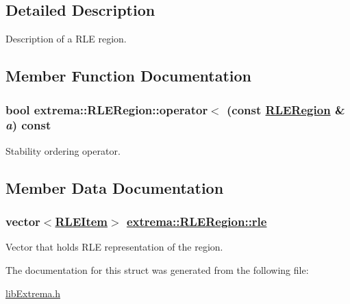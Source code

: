 \subsection{Detailed Description}
Description of a RLE region. 



\subsection{Member Function Documentation}
\hypertarget{structextrema_1_1RLERegion_e84a02a4b45914740b25ceb7924f9282}{
\subsubsection[operator$<$]{\setlength{\rightskip}{0pt plus 5cm}bool extrema::RLERegion::operator$<$ (const \hyperlink{structextrema_1_1RLERegion}{RLERegion} \& {\em a}) const}}
\label{structextrema_1_1RLERegion_e84a02a4b45914740b25ceb7924f9282}


Stability ordering operator. 



\subsection{Member Data Documentation}
\hypertarget{structextrema_1_1RLERegion_34dbc363e564a8678830ae416e480a42}{
\subsubsection[rle]{\setlength{\rightskip}{0pt plus 5cm}vector$<$\hyperlink{structextrema_1_1RLEItem}{RLEItem}$>$ \hyperlink{structextrema_1_1RLERegion_34dbc363e564a8678830ae416e480a42}{extrema::RLERegion::rle}}}
\label{structextrema_1_1RLERegion_34dbc363e564a8678830ae416e480a42}


Vector that holds RLE representation of the region. 



The documentation for this struct was generated from the following file:\begin{CompactItemize}
\item 
\hyperlink{libExtrema_8h}{lib\-Extrema.h}\end{CompactItemize}
